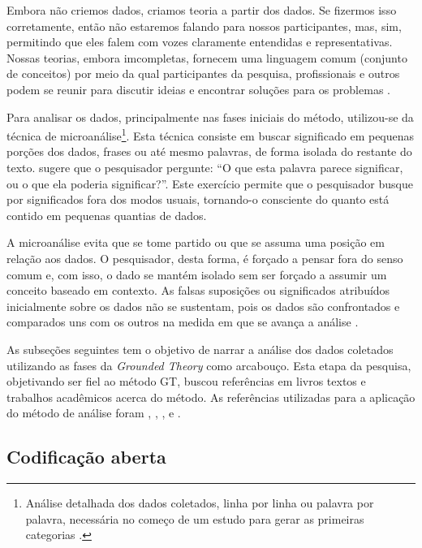 \begin{citacao}
Embora não criemos dados, criamos teoria a partir dos dados. Se fizermos isso corretamente, então não estaremos falando para nossos participantes, mas, sim, permitindo que eles falem com vozes claramente entendidas e representativas. Nossas teorias, embora imcompletas, fornecem uma linguagem comum (conjunto de conceitos) por meio da qual participantes da pesquisa, profissionais e outros podem se reunir para discutir ideias e encontrar soluções para os problemas \cite{corbin:98}.
\end{citacao}

Para analisar os dados, principalmente nas fases iniciais do método, utilizou-se da técnica de microanálise\footnote{Análise detalhada dos dados coletados, linha por linha ou palavra por palavra, necessária no começo de um estudo para gerar as primeiras categorias \cite{corbin:98}.}. Esta técnica consiste em buscar significado em pequenas porções dos dados, frases ou até mesmo palavras, de forma isolada do restante do texto.  sugere que o pesquisador pergunte: ``O que esta palavra parece significar, ou o que ela poderia significar?''. Este exercício permite que o pesquisador busque por significados fora dos modos usuais, tornando-o consciente do quanto está contido em pequenas quantias de dados.

A microanálise evita que se tome partido ou que se assuma uma posição em relação aos dados. O pesquisador, desta forma, é forçado a pensar fora do senso comum e, com isso, o dado se mantém isolado sem ser forçado a assumir um conceito baseado em contexto. As falsas suposições ou significados atribuídos inicialmente sobre os dados não se sustentam, pois os dados são confrontados e comparados uns com os outros na medida em que se avança a análise \cite{corbin:98}.

As subseções seguintes tem o objetivo de narrar a análise dos dados coletados utilizando as fases da \textit{Grounded Theory} como arcabouço. Esta etapa da pesquisa, objetivando ser fiel ao método GT, buscou referências em livros textos e trabalhos acadêmicos acerca do método. As referências utilizadas para a aplicação do método de análise foram , , ,  e .

	\subsection{Codificação aberta}
	
